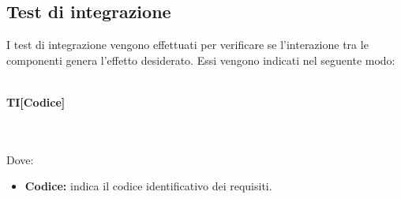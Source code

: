 \subsection{Test di integrazione}

I test di integrazione vengono effettuati per verificare se l'interazione tra le componenti genera l'effetto desiderato. Essi vengono indicati nel seguente modo:\\\\
\centerline{\textbf{TI[Codice]}}\\\\
Dove:
\begin{itemize}
	\item \textbf{Codice:} indica il codice identificativo dei requisiti.
\end{itemize}
\renewcommand{\arraystretch}{1.5}
